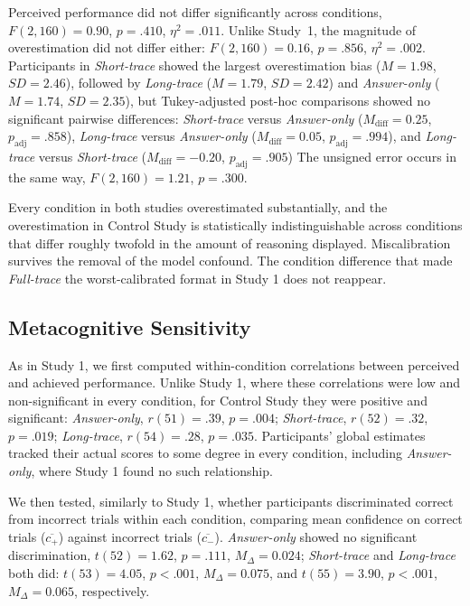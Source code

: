 \documentclass[manuscript,review,anonymous]{acmart}
\begin{document}
Perceived performance did not differ significantly across conditions, $F(2, 160)
= 0.90$, $p = .410$, $\eta^2 = .011$. Unlike Study~1, the magnitude of
overestimation did not differ either: $F(2, 160) = 0.16$, $p = .856$, $\eta^2 =
.002$. Participants in \textit{Short-trace} showed the largest overestimation
bias ($M = 1.98$, $SD = 2.46$), followed by \textit{Long-trace} ($M = 1.79$, $SD
= 2.42$) and \textit{Answer-only} ($M = 1.74$, $SD = 2.35$), but Tukey-adjusted
post-hoc comparisons showed no significant pairwise differences:
\textit{Short-trace} versus \textit{Answer-only} ($M_{\mathrm{diff}} = 0.25$,
$p_{\mathrm{adj}} = .858$), \textit{Long-trace} versus \textit{Answer-only}
($M_{\mathrm{diff}} = 0.05$, $p_{\mathrm{adj}} = .994$), and \textit{Long-trace}
versus \textit{Short-trace} ($M_{\mathrm{diff}} = -0.20$, $p_{\mathrm{adj}} =
.905$) The unsigned error occurs in the same way, $F(2, 160) = 1.21$, $p = .300$.

Every condition in both studies overestimated substantially, and the overestimation in Control Study is statistically indistinguishable across conditions that differ roughly twofold in the amount of reasoning displayed. Miscalibration survives the removal of the model confound. The condition difference that made \textit{Full-trace} the worst-calibrated format in Study 1 does not reappear.

\subsection{Metacognitive Sensitivity}
As in Study 1, we first computed
within-condition correlations between perceived and achieved performance.
Unlike Study 1, where these correlations were low and non-significant in every
condition, for Control Study they were positive and significant:
\textit{Answer-only}, $r(51) = .39$, $p = .004$; \textit{Short-trace}, $r(52) =
.32$, $p = .019$; \textit{Long-trace}, $r(54) = .28$, $p = .035$. Participants'
global estimates tracked their actual scores to some degree in every condition,
including \textit{Answer-only}, where Study 1 found no such relationship.

We then tested, similarly to Study 1, whether participants discriminated correct from
incorrect trials within each condition, comparing mean confidence on correct
trials ($\overline{c_+}$) against incorrect trials ($\overline{c_-}$).
\textit{Answer-only} showed no significant discrimination, $t(52) = 1.62$, $p
= .111$, $M_\Delta = 0.024$; \textit{Short-trace} and \textit{Long-trace} both
did: $t(53) = 4.05$, $p < .001$, $M_\Delta = 0.075$, and $t(55) = 3.90$, $p <
.001$, $M_\Delta = 0.065$, respectively.
\end{document}
